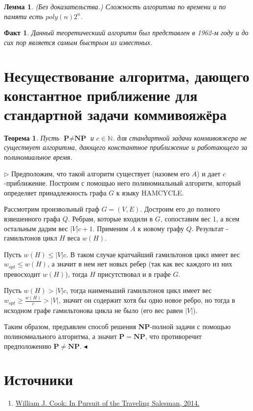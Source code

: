 \documentclass[A4, twocolumn]{article}
\newtheorem{Fact}{Факт}
\newtheorem{Th}{Теорема}
\newtheorem{Lem}{Лемма}
\newenvironment{PROOF}
{\par\noindent{\bf Доказательство:}\newline$\triangleright$}
{\hfill$\scriptstyle\blacktriangleleft$}
\begin{document}
	\begin{Lem}{(Без доказательства.)}
		Сложность алгоритма по времени и по памяти есть $poly(n)2^n$.
	\end{Lem}

	\begin{Fact}
		Данный теоретическиий алгоритм был представлен в 1962-м году и до сих пор является самым быстрым из известных.
	\end{Fact}
	
	\section{\textbf{Несуществование алгоритма, дающего константное приближение для стандартной задачи коммивояжёра}}
	
	\begin{Th}
		Пусть  $\textbf{P} \ne \textbf{NP}$ и  $c \in \mathbb{N}$. для стандартной задачи коммивояжера не существует алгоритма, дающего константное приближение и работающего за полиномиальное время.	
	\end{Th}
	
	\begin{PROOF}
	Предположим, что такой алгоритм существует (назовем его $A$) и дает $c$-приближение. Построим с помощью него полиномиальный алгоритм, который определяет принадлежность графа $G$ к языку HAMCYCLE.
	
	Рассмотрим произвольный граф $G = (V, E)$. Достроим его до полного взвешенного графа $Q$. Ребрам, которые входили в $G$, сопоставим вес 1, а всем остальным дадим вес $|V|c + 1$. Применим $A$ к новому графу $Q$. Результат - гамильтонов цикл $H$ веса $w(H)$.
	
	Пусть $w(H) \leq |V|c$. В таком случае кратчайший гамильтонов цикл имеет вес $w_{opt} \leq w(H)$, а значит в нем нет новых ребер (так как вес каждого из них превосходит $w(H)$), тогда $H$ присутствовал и в графе $G$.
	
	Пусть $w(H) > |V|c$, тогда наименьший гамильтонов цикл имеет вес $w_{opt} \geq \frac{w(H)}{c} > |V|$, значит он содержит хотя бы одно новое ребро, но тогда в исходном графе гамильтонова цикла не было (его вес равен $|V|$).
	
	Таким образом, предъявлен способ решения \textbf{NP}-полной задачи с помощью полиномиального алгоритма, а значит $\mathbf{P} = \mathbf{NP}$, что противоречит предположению $\mathbf{P} \ne \mathbf{NP}$.	
	\end{PROOF}

	
	
	\section{Источники}
	\begin{enumerate}
		\item \label{book1} \href{https://press.princeton.edu/titles/9531.html}{William J. Cook: In Pursuit of the Traveling Salesman, 2014.}
	\end{enumerate}
	 	
	 
   
\end{document}

